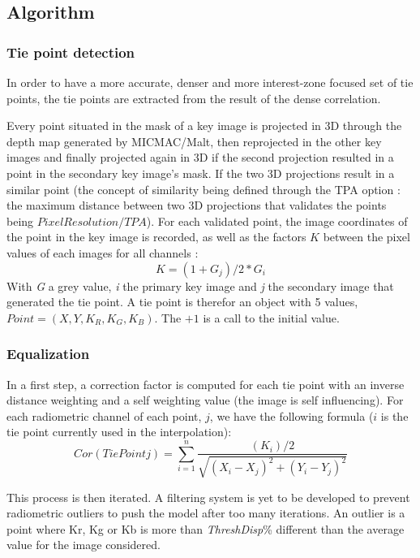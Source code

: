 \subsection{Algorithm}

\subsubsection{Tie point detection}

In order to have a more accurate, denser and more interest-zone focused set of tie points, the tie points are extracted from the result of the dense correlation.


 Every point situated in the mask of a key image is projected in 3D through the depth map generated by MICMAC/Malt, then reprojected in the other key images and finally projected again in 3D if the second projection resulted in a point in the secondary key image's mask. If the two 3D projections result in a similar point (the concept of similarity being defined through the TPA option : the maximum distance between two 3D projections that validates the points being $PixelResolution/TPA$). For each validated point, the image coordinates of the point in the key image is recorded, as well as the factors $K$ between the pixel values of each images for all channels : \[K=(1+G_{j})/2*G_{i}\]
 With \textit{G} a grey value, \textit{i} the primary key image and \textit{j} the secondary image that generated the tie point. A tie point is therefor an object with 5 values, $Point=(X,Y,K_{R},K_{G},K_{B})$. The $+1$ is a call to the initial value.

\subsubsection{Equalization}

In a first step, a correction factor is computed for each tie point with an inverse distance weighting and a self weighting value (the image is self influencing). For each radiometric channel of each point, $j$, we have the following formula ($i$ is the tie point currently used in the interpolation): 
\[Cor(TiePointj)=\sum_{i=1}^{n} \frac{(K_{i})/2}{\sqrt{(X_{i}-X_{j})^2+(Y_{i}-Y_{j})^2}}\]

This process is then iterated. A filtering system is yet to be developed to prevent radiometric outliers to push the model after too many iterations. An outlier is a point where Kr, Kg or Kb is more than \textit{ThreshDisp}\% different than the average value for the image considered.


